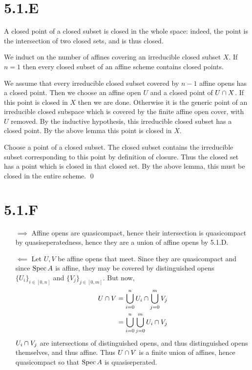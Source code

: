 \documentclass{article}
\begin{document}
\section{5.1.E}
A closed point of a closed subset is closed in the whole space: indeed, the
point is the intersection of two closed sets, and is thus closed.

We induct on the number of affines covering an irreducible closed subset
$X$. If $n=1$ then every closed subset of
an affine scheme contains closed points.

We assume that every irreducible closed subset covered by
$n-1$ affine opens has a closed point. Then we choose an
affine open $U$ and a closed point of
$U \cap X$. If this point is closed in $X$
then we are done. Otherwise it is the generic point of an irreducible closed
subspace which is covered by the finite affine open cover, with
$U$ removed. By the inductive hypothesis, this irreducible
closed subset has a closed point. By the above lemma this point is closed in
$X$.

Choose a point of a closed subset. The closed subset contains the irreducible
subset corresponding to this point by definition of closure. Thus the closed
set has a point which is closed in that closed set. By the above lemma, this
must be closed in the entire scheme. \qed

\section{5.1.F}
\begin{enumerate}[a.]
    \item [$\implies$] Affine opens are quasicompact, hence their
          intersection is quasicompact by quasiseperatedness, hence they are a union of
          affine opens by 5.1.D.
    \item [$\impliedby$] Let $U, V$ be affine opens that meet.
          Since they are quasicompact and since $\operatorname{Spec} A$ is affine, they
          may be covered by distinguished opens $\{U_i\}_{i \in [0,n]}$ and
          $\{V_j\}_{j \in [0,m]}$. But now,
          \begin{align*}
              U \cap V & = \bigcup_{i=0}^n U_i \cap \bigcup_{j=0}^m V_j \\
                             & = \bigcup_{i=0}^n \bigcup_{j=0}^m U_i \cap V_j
          \end{align*}
          $U_i \cap V_j$ are intersections of distinguished opens, and thus
          distinguished opens themselves, and thus affine. Thus $U \cap V$ is
          a finite union of affines, hence quasicompact so that $\operatorname{Spec} A$ is
          quasiseperated.
\end{enumerate}
\end{document}
